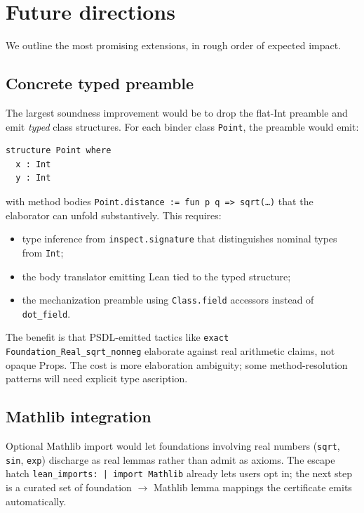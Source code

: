 \section{Future directions}

We outline the most promising extensions, in rough order of
expected impact.

\subsection{Concrete typed preamble}

The largest soundness improvement would be to drop the flat-Int
preamble and emit \emph{typed} class structures.  For each binder
class \texttt{Point}, the preamble would emit:

\begin{lstlisting}[language=lean4]
structure Point where
  x : Int
  y : Int
\end{lstlisting}

with method bodies \texttt{Point.distance := fun p q => sqrt(\dots)}
that the elaborator can unfold substantively.  This requires:
\begin{itemize}[leftmargin=1.7em]
  \item type inference from \texttt{inspect.signature} that
    distinguishes nominal types from \texttt{Int};
  \item the body translator emitting Lean tied to the typed
    structure;
  \item the mechanization preamble using
    \texttt{Class.field} accessors instead of
    \texttt{dot\_field}.
\end{itemize}

The benefit is that PSDL-emitted tactics like
\texttt{exact Foundation\_Real\_sqrt\_nonneg} elaborate against
real arithmetic claims, not opaque Props.  The cost is more
elaboration ambiguity; some method-resolution patterns will need
explicit type ascription.

\subsection{Mathlib integration}

Optional Mathlib import would let foundations involving real
numbers (\texttt{sqrt}, \texttt{sin}, \texttt{exp}) discharge as
real lemmas rather than admit as axioms.  The escape hatch
\texttt{lean\_imports: | import Mathlib} already lets users opt in;
the next step is a curated set of foundation $\to$ Mathlib lemma
mappings the certificate emits automatically.

